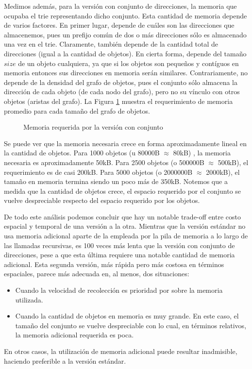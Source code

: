 Medimos además, para la versión con conjunto de direcciones, la memoria que ocupaba el trie representando dicho conjunto. Esta cantidad de memoria depende de varios factores. En primer lugar, depende de cuáles son las direcciones que almacenemos, pues un prefijo común de dos o más direcciones sólo es almacenado una vez en el trie. Claramente, también depende de la cantidad total de direcciones (igual a la cantidad de objetos). En cierta forma, depende del tamaño $size$ de un objeto cualquiera, ya que si los objetos son pequeños y contíguos en memoria entonces sus direcciones en memoria serán similares. Contrariamente, no depende de la densidad del grafo de objetos, pues el conjunto sólo almacena la dirección de cada objeto (de cada nodo del grafo), pero no su vínculo con otros objetos (aristas del grafo). La Figura \ref{fig:memoria} muestra el requerimiento de memoria promedio para cada tamaño del grafo de objetos.

\begin{figure}[H]
\centering

\caption{Memoria requerida por la versión con conjunto}
\label{fig:memoria}
\end{figure}

Se puede ver que la memoria necesaria crece en forma aproximadamente lineal en la cantidad de objetos. Para 1000 objetos (u 80000B $\approx$ 80kB) , la memoria necesaria es aproximadamente 50kB. Para 2500 objetos (o 500000B $\approx$ 500kB), el requerimiento es de casi 200kB. Para 5000 objetos (o 2000000B $\approx$ 2000kB), el tamaño en memoria termina siendo un poco más de 350kB. Notemos que a medida que la cantidad de objetos crece, el espacio requerido por el conjunto se vuelve despreciable respecto del espacio requerido por los objetos.

De todo este análisis podemos concluir que hay un notable trade-off entre costo espacial y temporal de una versión a la otra. Mientras que la versión estándar no usa memoria adicional aparte de la empleada por la pila de memoria a lo largo de las llamadas recursivas, es 100 veces más lenta que la versión con conjunto de direcciones, pese a que esta última requiere una notable cantidad de memoria adicional. Esta segunda versión, más rápida pero más costosa en términos espaciales, parece más adecuada en, al menos, dos situaciones:

\begin{itemize}
\item Cuando la velocidad de recolección es prioridad por sobre la memoria utilizada.

\item Cuando la cantidad de objetos en memoria es muy grande. En este caso, el tamaño del conjunto se vuelve despreciable con lo cual, en términos relativos, la memoria adicional requerida es poca.
\end{itemize}

En otros casos, la utilización de memoria adicional puede resultar inadmisible, haciendo preferible a la versión estándar.